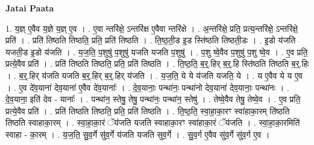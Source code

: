 \documentclass[17pt]{extarticle}
\begin{document}
\textbf{Jatai Paata} \newline

1. य॒ज्ञ् ए॒वैव य॒ज्ञे य॒ज्ञ् ए॒व । . ए॒वा न्तरि॑क्षे॒ ऽन्तरि॑क्ष ए॒वैवा न्तरि॑क्षे । . अ॒न्तरि॑क्षे॒ प्रति॒ प्रत्य॒न्तरि॑क्षे॒ ऽन्तरि॑क्षे॒ प्रति॑ । . प्रति॑ तिष्ठति तिष्ठति॒ प्रति॒ प्रति॑ तिष्ठति । . ति॒ष्ठ॒ती॒ड इ॒ड स्ति॑ष्ठति तिष्ठती॒डः । . इ॒डो य॑जति यजती॒ड इ॒डो य॑जति । . य॒ज॒ति॒ प॒शुषु॑ प॒शुषु॑ यजति यजति प॒शुषु॑ । . प॒शु ष्वे॒वैव प॒शुषु॑ प॒शु ष्वे॒व । . ए॒व प्रति॒ प्रत्ये॒वैव प्रति॑ । . प्रति॑ तिष्ठति तिष्ठति॒ प्रति॒ प्रति॑ तिष्ठति । . ति॒ष्ठ॒ति॒ ब॒र्॒.हिर् ब॒र्॒.हि स्ति॑ष्ठति तिष्ठति ब॒र्॒.हिः । . ब॒र्॒.हिर् य॑जति यजति ब॒र्॒.हिर् ब॒र्॒.हिर् य॑जति । . य॒ज॒ति॒ ये ये य॑जति यजति॒ ये । . य ए॒वैव ये य ए॒व । . ए॒व दे॑व॒याना॑ देव॒याना॑ ए॒वैव दे॑व॒यानाः᳚ । . दे॒व॒यानाः॒ पन्था॑नः॒ पन्था॑नो देव॒याना॑ देव॒यानाः॒ पन्था॑नः । . दे॒व॒याना॒ इति॑ देव - यानाः᳚ । . पन्था॑न॒ स्तेषु॒ तेषु॒ पन्था॑नः॒ पन्था॑न॒ स्तेषु॑ । . तेष्वे॒वैव तेषु॒ तेष्वे॒व । . ए॒व प्रति॒ प्रत्ये॒वैव प्रति॑ । . प्रति॑ तिष्ठति तिष्ठति॒ प्रति॒ प्रति॑ तिष्ठति । . ति॒ष्ठ॒ति॒ स्वा॒हा॒का॒रꣳ स्वा॑हाका॒रम् ति॑ष्ठति तिष्ठति स्वाहाका॒रम् । . स्वा॒हा॒का॒रं ॅय॑जति यजति स्वाहाका॒रꣳ स्वा॑हाका॒रं ॅय॑जति । . स्वा॒हा॒का॒रमिति॑ स्वाहा - का॒रम् । . य॒ज॒ति॒ सु॒व॒र्गे सु॑व॒र्गे य॑जति यजति सुव॒र्गे । . सु॒व॒र्ग ए॒वैव सु॑व॒र्गे सु॑व॒र्ग ए॒व । \newline
\end{document}
